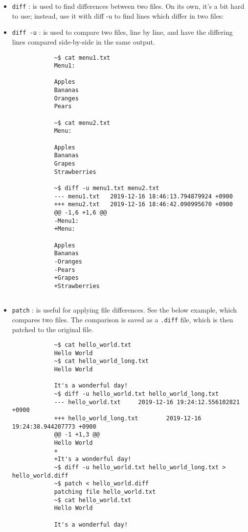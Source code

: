 	\begin{itemize}
		\item \verb|diff| : is used to find differences between two files. On its own, it’s a bit hard to use; instead, use it with diff -u to find lines which differ in two files:
		
		\item \verb|diff -u| : is used to compare two files, line by line, and have the differing lines compared side-by-side in the same output.
		
		\begin{verbatim}
			~$ cat menu1.txt 
			Menu1:
			
			Apples
			Bananas
			Oranges
			Pears
			
			~$ cat menu2.txt 
			Menu:
			
			Apples
			Bananas
			Grapes
			Strawberries
			
			~$ diff -u menu1.txt menu2.txt 
			--- menu1.txt   2019-12-16 18:46:13.794879924 +0900
			+++ menu2.txt   2019-12-16 18:46:42.090995670 +0900
			@@ -1,6 +1,6 @@
			-Menu1:
			+Menu:
			
			Apples
			Bananas
			-Oranges
			-Pears
			+Grapes
			+Strawberries
			
		\end{verbatim}
		
		\item \verb|patch| : is useful for applying file differences. See the below example, which compares two files. The comparison is saved as a \verb|.diff| file, which is then patched to the original file.
		
		\begin{verbatim}
			~$ cat hello_world.txt 
			Hello World
			~$ cat hello_world_long.txt 
			Hello World
			
			It's a wonderful day!
			~$ diff -u hello_world.txt hello_world_long.txt 
			--- hello_world.txt     2019-12-16 19:24:12.556102821 +0900
			+++ hello_world_long.txt        2019-12-16 19:24:38.944207773 +0900
			@@ -1 +1,3 @@
			Hello World
			+
			+It's a wonderful day!
			~$ diff -u hello_world.txt hello_world_long.txt > hello_world.diff
			~$ patch < hello_world.diff 
			patching file hello_world.txt
			~$ cat hello_world.txt 
			Hello World
			
			It's a wonderful day!
		\end{verbatim}
	\end{itemize}






